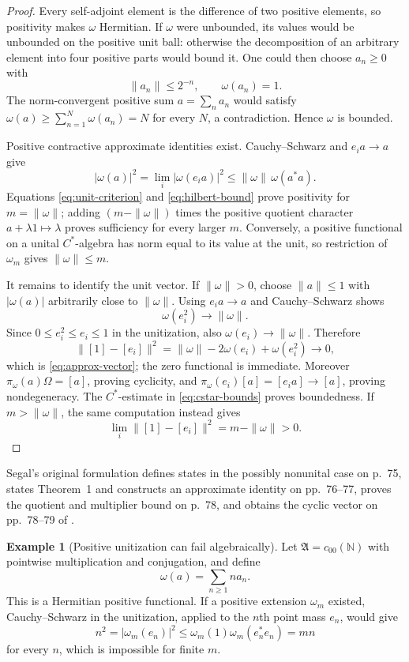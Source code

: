 \documentclass[11pt]{article}
\theoremstyle{definition}
\newtheorem{example}[theorem]{Example}
\theoremstyle{remark}
\numberwithin{equation}{section}
\begin{document}
\begin{proof}
Every self-adjoint element is the difference of two positive elements,
so positivity makes $\omega$ Hermitian.  If $\omega$ were unbounded, its
values would be unbounded on the positive unit ball: otherwise the
decomposition of an arbitrary element into four positive parts would
bound it.  One could then choose $a_n\geq0$ with
\[
 \|a_n\|\leq2^{-n},\qquad \omega(a_n)=1.
\]
The norm-convergent positive sum $a=\sum_na_n$ would satisfy
$\omega(a)\geq\sum_{n=1}^N\omega(a_n)=N$ for every $N$, a
contradiction.  Hence $\omega$ is bounded.

Positive contractive approximate identities exist.  Cauchy--Schwarz and
$e_i a\to a$ give
\begin{equation}
 |\omega(a)|^2
 =\lim_i|\omega(e_i a)|^2
 \leq\|\omega\|\,\omega(a^*a).
 \label{eq:hilbert-bound}
\end{equation}
Equations \eqref{eq:unit-criterion} and \eqref{eq:hilbert-bound} prove
positivity for $m=\|\omega\|$; adding $(m-\|\omega\|)$ times the
positive quotient character $a+\lambda1\mapsto\lambda$ proves
sufficiency for every larger $m$.  Conversely, a positive functional on
a unital $C^*$-algebra has norm equal to its value at the unit, so
restriction of $\omega_m$ gives $\|\omega\|\leq m$.

It remains to identify the unit vector.  If $\|\omega\|>0$, choose
$\|a\|\leq1$ with $|\omega(a)|$ arbitrarily close to $\|\omega\|$.
Using $e_i a\to a$ and Cauchy--Schwarz shows
\[
 \omega(e_i^2)\longrightarrow\|\omega\|.
\]
Since $0\leq e_i^2\leq e_i\leq1$ in the unitization, also
$\omega(e_i)\to\|\omega\|$.  Therefore
\[
 \|[1]-[e_i]\|^2
 =\|\omega\|-2\omega(e_i)+\omega(e_i^2)\longrightarrow0,
\]
which is \eqref{eq:approx-vector}; the zero functional is immediate.
Moreover $\pi_\omega(a)\Omega=[a]$, proving cyclicity, and
$\pi_\omega(e_i)[a]=[e_i a]\to[a]$, proving nondegeneracy.  The
$C^*$-estimate in \eqref{eq:cstar-bounds} proves boundedness.  If
$m>\|\omega\|$, the same computation instead gives
\[
 \lim_i\|[1]-[e_i]\|^2=m-\|\omega\|>0.
\]
\end{proof}

Segal's original formulation defines states in the possibly nonunital
case on p.~75, states Theorem~1 and constructs an approximate identity on
pp.~76--77, proves the quotient and multiplier bound on p.~78, and
obtains the cyclic vector on pp.~78--79 of \cite{Segal1947}.

\begin{example}[Positive unitization can fail algebraically]
Let $\mathfrak A=c_{00}(\mathbb N)$ with pointwise multiplication and
conjugation, and define
\[
 \omega(a)=\sum_{n\geq1}n a_n.
\]
This is a Hermitian positive functional.  If a positive extension
$\omega_m$ existed, Cauchy--Schwarz in the unitization, applied to the
$n$th point mass $e_n$, would give
\[
 n^2=|\omega_m(e_n)|^2
 \leq\omega_m(1)\omega_m(e_n^*e_n)=mn
\]
for every $n$, which is impossible for finite $m$.
\end{example}
\end{document}
